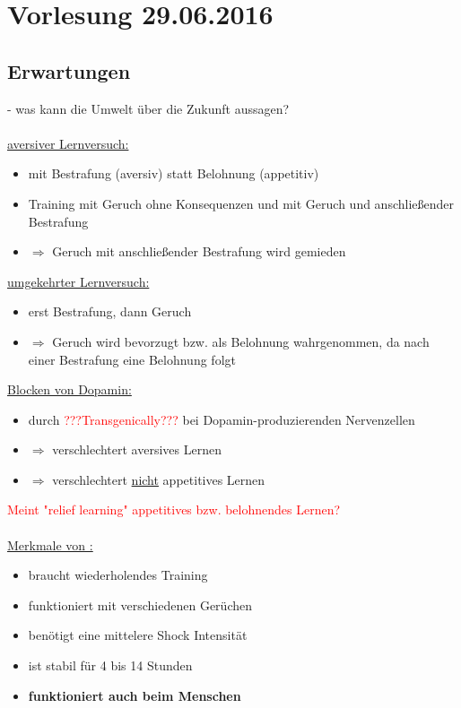 \section{Vorlesung 29.06.2016}

\subsection{Erwartungen}
 - was kann die Umwelt über die Zukunft aussagen?
\\\\
\underline{aversiver Lernversuch:}
\begin{itemize}
	\item mit Bestrafung (aversiv) statt Belohnung (appetitiv)
	\item Training mit Geruch ohne Konsequenzen und mit Geruch und anschließender Bestrafung
	\item $\Rightarrow$ Geruch mit anschließender Bestrafung wird gemieden
\end{itemize}

\underline{umgekehrter Lernversuch:}
\begin{itemize}
	\item erst Bestrafung, dann Geruch
	\item $\Rightarrow$ Geruch wird bevorzugt bzw. als Belohnung wahrgenommen, da nach einer Bestrafung eine Belohnung folgt
\end{itemize}

\underline{Blocken von Dopamin:}
\begin{itemize}
	\item durch \textcolor{red}{???Transgenically???} bei Dopamin-produzierenden Nervenzellen
	\item $\Rightarrow$ verschlechtert aversives Lernen
	\item $\Rightarrow$ verschlechtert \underline{nicht} appetitives Lernen
\end{itemize}

\textcolor{red}{Meint "relief learning" appetitives bzw. belohnendes Lernen?}
\\\\
\underline{Merkmale von :}
\begin{itemize}
	\item braucht wiederholendes Training
	\item funktioniert mit verschiedenen Gerüchen
	\item benötigt eine mittelere Shock Intensität
	\item ist stabil für 4 bis 14 Stunden
	\item \textbf{funktioniert auch beim Menschen}
\end{itemize}

